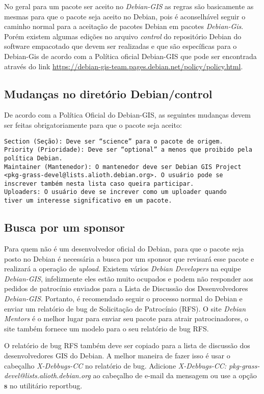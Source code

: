 No geral para um pacote ser aceito no \textit{Debian-GIS} as regras são basicamente as mesmas para que o pacote seja aceito no Debian, pois é aconselhável seguir o caminho normal para a aceitação de pacotes Debian em pacotes \textit{Debian-Gis}. Porém existem algumas edições no arquivo \textit{control} do repositório Debian do software empacotado que devem ser realizadas e que são específicas para o Debian-Gis de acordo com a Política oficial Debian-GIS que pode ser encontrada através do link \url{https://debian-gis-team.pages.debian.net/policy/policy.html}.

\subsection{Mudanças no diretório Debian/control}
De acordo com a Política Oficial do Debian-GIS, as seguintes mudanças devem ser feitas obrigatoriamente para que o pacote seja aceito:
\begin{verbatim}
Section (Seção): Deve ser “science” para o pacote de origem.
Priority (Prioridade): Deve ser “optional” a menos que proibido pela
política Debian.
Maintainer (Mantenedor): O mantenedor deve ser Debian GIS Project
<pkg-grass-devel@lists.alioth.debian.org>. O usuário pode se
inscrever também nesta lista caso queira participar.
Uploaders: O usuário deve se increver como um uploader quando
tiver um interesse significativo em um pacote.
\end{verbatim}

\subsection{Busca por um sponsor}

Para quem não é um desenvolvedor oficial do Debian, para que o pacote seja posto no Debian é necessária a busca por um sponsor que revisará esse pacote e realizará a operação de \textit{upload}. Existem vários \textit{Debian Developers} na equipe \textit{Debian-GIS}, infelizmente eles estão muito ocupados e podem não responder aos pedidos de patrocínio enviados para a Lista de Discussão dos Desenvolvedores \textit{Debian-GIS}. Portanto, é recomendado seguir o processo normal do Debian e enviar um relatório de bug de Solicitação de Patrocínio (RFS). O site \textit{Debian Mentors} é o melhor lugar para enviar seu pacote para atrair patrocinadores, o site também fornece um modelo para o seu relatório de bug RFS.

O relatório de bug RFS também deve ser copiado para a lista de discussão dos desenvolvedores GIS do Debian. A melhor maneira de fazer isso é usar o cabeçalho\textit{ X-Debbugs-CC} no relatório de bug. Adicione \textit{X-Debbugs-CC: pkg-grass-devel@lists.alioth.debian.org} ao cabeçalho de e-mail da mensagem ou use a opção \textbf{s} no utilitário reportbug.